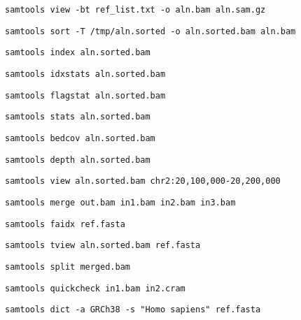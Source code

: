 \begin{lstlisting}[style=mycommandBlockStyle]
samtools view -bt ref_list.txt -o aln.bam aln.sam.gz 
\end{lstlisting}
\begin{lstlisting}[style=mycommandBlockStyle]
samtools sort -T /tmp/aln.sorted -o aln.sorted.bam aln.bam 
\end{lstlisting}
\begin{lstlisting}[style=mycommandBlockStyle]
samtools index aln.sorted.bam 
\end{lstlisting}
\begin{lstlisting}[style=mycommandBlockStyle]
samtools idxstats aln.sorted.bam 
\end{lstlisting}
\begin{lstlisting}[style=mycommandBlockStyle]
samtools flagstat aln.sorted.bam 
\end{lstlisting}
\begin{lstlisting}[style=mycommandBlockStyle]
samtools stats aln.sorted.bam 
\end{lstlisting}
\begin{lstlisting}[style=mycommandBlockStyle]
samtools bedcov aln.sorted.bam 
\end{lstlisting}
\begin{lstlisting}[style=mycommandBlockStyle]
samtools depth aln.sorted.bam 
\end{lstlisting}
\begin{lstlisting}[style=mycommandBlockStyle]
samtools view aln.sorted.bam chr2:20,100,000-20,200,000 
\end{lstlisting}
\begin{lstlisting}[style=mycommandBlockStyle]
samtools merge out.bam in1.bam in2.bam in3.bam 
\end{lstlisting}
\begin{lstlisting}[style=mycommandBlockStyle]
samtools faidx ref.fasta 
\end{lstlisting}
\begin{lstlisting}[style=mycommandBlockStyle]
samtools tview aln.sorted.bam ref.fasta 
\end{lstlisting}
\begin{lstlisting}[style=mycommandBlockStyle]
samtools split merged.bam 
\end{lstlisting}
\begin{lstlisting}[style=mycommandBlockStyle]
samtools quickcheck in1.bam in2.cram 
\end{lstlisting}
\begin{lstlisting}[style=mycommandBlockStyle]
samtools dict -a GRCh38 -s "Homo sapiens" ref.fasta 
\end{lstlisting}
